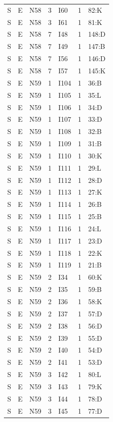 {\begin{longtable}{lllrlrp{.35\linewidth}}
S & E & N58 & 3 & I60 & 1 & 82:K \\
S & E & N58 & 3 & I61 & 1 & 81:K \\
S & E & N58 & 7 & I48 & 1 & 148:D \\
S & E & N58 & 7 & I49 & 1 & 147:B \\
S & E & N58 & 7 & I56 & 1 & 146:D \\
S & E & N58 & 7 & I57 & 1 & 145:K \\
S & E & N59 & 1 & I104 & 1 & 36:B \\
S & E & N59 & 1 & I105 & 1 & 35:L \\
S & E & N59 & 1 & I106 & 1 & 34:D \\
S & E & N59 & 1 & I107 & 1 & 33:D \\
S & E & N59 & 1 & I108 & 1 & 32:B \\
S & E & N59 & 1 & I109 & 1 & 31:B \\
S & E & N59 & 1 & I110 & 1 & 30:K \\
S & E & N59 & 1 & I111 & 1 & 29:L \\
S & E & N59 & 1 & I112 & 1 & 28:D \\
S & E & N59 & 1 & I113 & 1 & 27:K \\
S & E & N59 & 1 & I114 & 1 & 26:B \\
S & E & N59 & 1 & I115 & 1 & 25:B \\
S & E & N59 & 1 & I116 & 1 & 24:L \\
S & E & N59 & 1 & I117 & 1 & 23:D \\
S & E & N59 & 1 & I118 & 1 & 22:K \\
S & E & N59 & 1 & I119 & 1 & 21:B \\
S & E & N59 & 2 & I34 & 1 & 60:K \\
S & E & N59 & 2 & I35 & 1 & 59:B \\
S & E & N59 & 2 & I36 & 1 & 58:K \\
S & E & N59 & 2 & I37 & 1 & 57:D \\
S & E & N59 & 2 & I38 & 1 & 56:D \\
S & E & N59 & 2 & I39 & 1 & 55:D \\
S & E & N59 & 2 & I40 & 1 & 54:D \\
S & E & N59 & 2 & I41 & 1 & 53:D \\
S & E & N59 & 3 & I42 & 1 & 80:L \\
S & E & N59 & 3 & I43 & 1 & 79:K \\
S & E & N59 & 3 & I44 & 1 & 78:D \\
S & E & N59 & 3 & I45 & 1 & 77:D \\

\end{longtable}}
